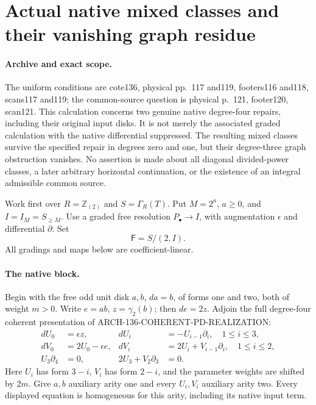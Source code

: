 \section{Actual native mixed classes and their vanishing graph residue}
\label{sec:136-native-mixed-tor}

\paragraph{Archive and exact scope.}
The uniform conditions are cote136, physical pp.~117 and119,
footers116 and118, scans117 and119; the common-source question is
physical p.~121, footer120, scan121. This calculation concerns two
genuine native degree-four repairs, including their original input
disks. It is not merely the associated graded calculation with the
native differential suppressed. The resulting mixed classes survive
the specified repair in degrees zero and one, but their degree-three
graph obstruction vanishes. No assertion is made about all diagonal
divided-power classes, a later arbitrary horizontal continuation, or
the existence of an integral admissible common source.

Work first over \(R=\mathbb Z_{(2)}\) and
\(S=\Gamma_R(T)\). Put \(M=2^a\), \(a\geq0\), and
\(I=I_M=S_{\geq M}\). Use a graded free resolution
\(P_\bullet\to I\), with augmentation \(\epsilon\) and
differential \(\partial\). Set
\[
                       \mathsf F=S/(2,I).
                                                               \tag{136.NM1}
\]
All gradings and maps below are coefficient-linear.

\paragraph{The native block.}
Begin with the free odd unit disk \(a,b\),
\(da=b\), of forms one and two, both of weight \(m>0\).
Write \(e=ab\), \(z=\gamma_2(b)\); then \(de=2z\).
Adjoin the full degree-four coherent presentation of
ARCH-136-COHERENT-PD-REALIZATION:
\[
\begin{aligned}
dU_0&=\epsilon z,&dU_i&=-U_{i-1}\partial_i,\quad 1\leq i\leq3,\\
dV_0&=2U_0-\epsilon e,&dV_i&=2U_i+V_{i-1}\partial_i,
                                                  \quad1\leq i\leq2,\\
U_3\partial_4&=0,&2U_3+V_2\partial_3&=0.
\end{aligned}                                                   \tag{136.NM2}
\]
Here \(U_i\) has form \(3-i\), \(V_i\) has form \(2-i\),
and the parameter weights are shifted by \(2m\).
Give \(a,b\) auxiliary arity one and every \(U_i,V_i\)
auxiliary arity two. Every displayed equation is homogeneous
for this arity, including its native input term.

